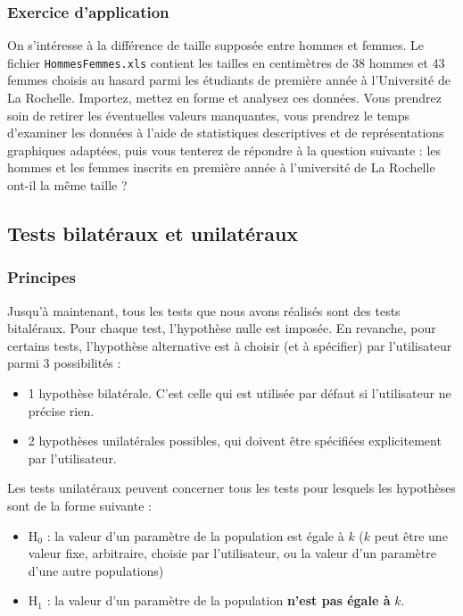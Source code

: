\documentclass[a4paperpaper,]{article}
\providecommand{\tightlist}{%
  \setlength{\itemsep}{0pt}\setlength{\parskip}{0pt}}
\begin{document}
\hypertarget{exercice-dapplication-2}{%
\subsubsection{Exercice d'application}\label{exercice-dapplication-2}}

On s'intéresse à la différence de taille supposée entre hommes et femmes. Le fichier \texttt{HommesFemmes.xls} contient les tailles en centimètres de 38 hommes et 43 femmes choisis au hasard parmi les étudiants de première année à l'Université de La Rochelle. Importez, mettez en forme et analysez ces données. Vous prendrez soin de retirer les éventuelles valeurs manquantes, vous prendrez le temps d'examiner les données à l'aide de statistiques descriptives et de représentations graphiques adaptées, puis vous tenterez de répondre à la question suivante : les hommes et les femmes inscrits en première année à l'université de La Rochelle ont-il la même taille ?

\hypertarget{tests-bilateraux-et-unilateraux}{%
\subsection{Tests bilatéraux et unilatéraux}\label{tests-bilateraux-et-unilateraux}}

\hypertarget{principes}{%
\subsubsection{Principes}\label{principes}}

Jusqu'à maintenant, tous les tests que nous avons réalisés sont des tests bitaléraux. Pour chaque test, l'hypothèse nulle est imposée. En revanche, pour certains tests, l'hypothèse alternative est à choisir (et à spécifier) par l'utilisateur parmi 3 possibilités :

\begin{itemize}
\tightlist
\item
  1 hypothèse bilatérale. C'est celle qui est utilisée par défaut si l'utilisateur ne précise rien.
\item
  2 hypothèses unilatérales possibles, qui doivent être spécifiées explicitement par l'utilisateur.
\end{itemize}

Les tests unilatéraux peuvent concerner tous les tests pour lesquels les hypothèses sont de la forme suivante :

\begin{itemize}
\tightlist
\item
  H\(_0\) : la valeur d'un paramètre de la population est égale à \(k\) (\(k\) peut être une valeur fixe, arbitraire, choisie par l'utilisateur, ou la valeur d'un paramètre d'une autre populations)
\item
  H\(_1\) : la valeur d'un paramètre de la population \textbf{n'est pas égale à} \(k\).
\end{itemize}
\end{document}
